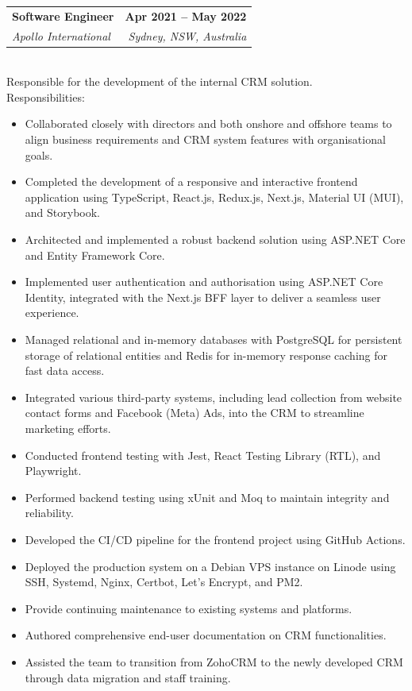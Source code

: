 \documentclass[12pt,a4paper]{article}
\makeatletter
\newcommand{\resumeItem}[1]{
  \item{
    {#1 \vspace{-2pt}}
  }
}
\newcommand{\resumeSubheading}[4]{
  \vspace{-2pt}\item
    \begin{tabular*}{1.0\textwidth}[t]{l@{\extracolsep{\fill}}r}
      \textbf{#1} & \textbf{\small #2} \\
      \textit{#3} & \textit{\small #4} \\
    \end{tabular*}\vspace{-7pt}
}
\newcommand{\resumeItemListStart}{\begin{itemize}\itemsep0.2em}
\newcommand{\resumeItemListEnd}{\end{itemize}\vspace{-5pt}}
\makeatother
\begin{document}
    \resumeSubheading
      {Software Engineer}{Apr 2021 -- May 2022}
      {Apollo International}{Sydney, NSW, Australia}
      \\ \vspace{8pt} Responsible for the development of the internal CRM solution.
      \\ Responsibilities: \vspace{-6pt}
      \resumeItemListStart
        \resumeItem{Collaborated closely with directors and both onshore and offshore teams to align business requirements and CRM system features with organisational goals.}
        \resumeItem{Completed the development of a responsive and interactive frontend application using TypeScript, React.js, Redux.js, Next.js, Material UI (MUI), and Storybook.}
        \resumeItem{Architected and implemented a robust backend solution using ASP.NET Core and Entity Framework Core.}
        \resumeItem{Implemented user authentication and authorisation using ASP.NET Core Identity, integrated with the Next.js BFF layer to deliver a seamless user experience.}
        \resumeItem{Managed relational and in-memory databases with PostgreSQL for persistent storage of relational entities and Redis for in-memory response caching for fast data access.}
        \resumeItem{Integrated various third-party systems, including lead collection from website contact forms and Facebook (Meta) Ads, into the CRM to streamline marketing efforts.}
        \resumeItem{Conducted frontend testing with Jest, React Testing Library (RTL), and Playwright.}
        \resumeItem{Performed backend testing using xUnit and Moq to maintain integrity and reliability.}
        \resumeItem{Developed the CI/CD pipeline for the frontend project using GitHub Actions.}
        \resumeItem{Deployed the production system on a Debian VPS instance on Linode using SSH, Systemd, Nginx, Certbot, Let's Encrypt, and PM2.}
        \resumeItem{Provide continuing maintenance to existing systems and platforms.}
        \resumeItem{Authored comprehensive end-user documentation on CRM functionalities.}
        \resumeItem{Assisted the team to transition from ZohoCRM to the newly developed CRM through data migration and staff training.}
      \resumeItemListEnd

      \vspace{0.5em}
\end{document}
